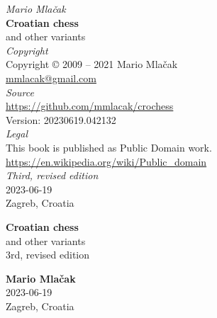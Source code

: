 \documentclass[a5paper,12pt]{book} %
\begin{document}
\thispagestyle{empty}
\vspace*{1.7\baselineskip}
\begin{center}
    \emph{Mario Mlačak} \\
    \textbf{Croatian chess} \\
    and other variants \\ [2.0em]

    \emph{Copyright} \\
    Copyright \copyright \hspace{0.2ex} 2009 -- 2021 Mario Mlačak \\
    \href{mailto:mmlacak@gmail.com}{mmlacak@gmail.com} \\ [2.0em]

    \emph{Source} \\
    \href{https://github.com/mmlacak/crochess}{https://github.com/mmlacak/crochess} \\
    Version: 20230619.042132 \\ [2.0em] %

    \emph{Legal} \\
    This book is published as Public Domain work. \\
    \href{https://en.wikipedia.org/wiki/Public\_domain}{https://en.wikipedia.org/wiki/Public\_domain} \\ [2.0em]

    \emph{Third, revised edition} \\
    2023-06-19 \\ %
    Zagreb, Croatia

    \vfill
    \LaTeXe
    \vspace*{1.7\baselineskip}
\end{center}
\clearpage %

\thispagestyle{empty}
\vspace*{7.3\baselineskip}
\begin{center}
    \textbf{\Large{Croatian chess}} \\ [1.0em]
    \large{and other variants} \\ [1.0em]
    \small{3rd, revised edition} \\ [2.0cm]
    \vspace*{7.3\baselineskip}

    \textbf{\large{Mario Mlačak}} \\ [1.0em]
    \small{2023-06-19} \\ [0.5em] %
    \small{Zagreb, Croatia}
\end{center}
\clearpage %
\end{document}
